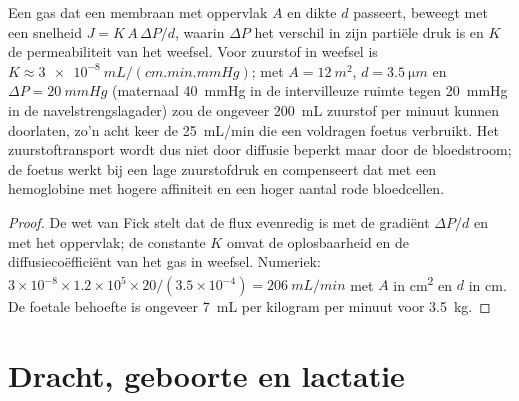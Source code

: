 \begin{theorem}\label{thm:b2:mammal-reproduction:fick}
Een gas dat een membraan met oppervlak $A$ en dikte $d$ passeert, beweegt
met een snelheid $J = K\,A\,\Delta P/d$, waarin $\Delta P$ het verschil in
zijn partiële druk is en $K$ de permeabiliteit van het weefsel. Voor
zuurstof in weefsel is $K \approx \qty{3e-8}{mL/(cm.min.mmHg)}$; met $A =
\qty{12}{m^2}$, $d = \qty{3.5}{\micro m}$ en $\Delta P =
\qty{20}{mmHg}$ (maternaal \qty{40}{mmHg} in de intervilleuze ruimte
tegen \qty{20}{mmHg} in de navelstrengslagader) zou de  ongeveer
\qty{200}{mL} zuurstof per minuut kunnen doorlaten, zo'n acht keer de
\qty{25}{mL/min} die een voldragen foetus verbruikt. Het zuurstoftransport
wordt dus niet door diffusie beperkt maar door de bloedstroom; de foetus
werkt bij een lage zuurstofdruk en compenseert dat met een hemoglobine met
hogere affiniteit en een hoger aantal rode bloedcellen.
\end{theorem}
\begin{proof}
De wet van Fick stelt dat de flux evenredig is met de gradiënt
$\Delta P/d$ en met het oppervlak; de constante $K$ omvat de oplosbaarheid
en de diffusiecoëfficiënt van het gas in weefsel. Numeriek:
$3\times 10^{-8}\times 1.2\times 10^{5}\times 20/(3.5\times 10^{-4})
= \qty{206}{mL/min}$ met $A$ in \unit{cm^2} en $d$ in \unit{cm}.
De foetale behoefte is ongeveer \qty{7}{mL} per kilogram per minuut voor
\qty{3.5}{kg}.
\end{proof}

\section{Dracht, geboorte en lactatie}

